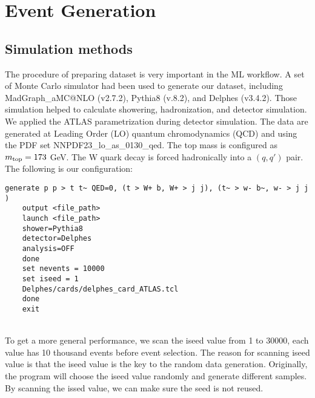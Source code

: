 \chapter{Event Generation}\label{Event Generation}



\section{Simulation methods}\label{sec:MC sample}
The procedure of preparing dataset is very important in the ML workflow. A set of Monte Carlo simulator had been used to generate our dataset, including MadGraph\_aMC@NLO (v2.7.2), Pythia8 (v.8.2), and Delphes (v3.4.2). Those simulation helped to calculate showering, hadronization, and detector simulation. We applied the ATLAS parametrization during detector simulation.  The data are generated at Leading Order (LO) quantum chromodynamics (QCD) and using the PDF set NNPDF23\_lo\_as\_0130\_qed. The top mass is configured as $m_{\rm top}=173$ GeV. The W quark decay is forced hadronically into a $(q, q')$ pair. The following is our configuration:
\\
\begin{adjustbox}{max width=\textwidth}
\centering
\begin{lstlisting}[caption={Configuration for generating samples. The ``iseed'' is just a placeholder, it will be changed when generating samples.},captionpos=b]
	generate p p > t t~ QED=0, (t > W+ b, W+ > j j), (t~ > w- b~, w- > j j ) 
	output <file_path> 
	launch <file_path> 
	shower=Pythia8  
	detector=Delphes 
	analysis=OFF 
	done  
	set nevents = 10000 
	set iseed = 1 
	Delphes/cards/delphes_card_ATLAS.tcl
	done 
	exit 
\end{lstlisting}
\end{adjustbox}
\\
To get a more general performance, we scan the iseed value from 1 to 30000, each value has 10 thousand events before event selection. The reason for scanning iseed value is that the iseed value is the key to the random data generation. Originally, the program will choose the iseed value randomly and generate different samples. By scanning the issed value, we can make sure the seed is not reused. 





